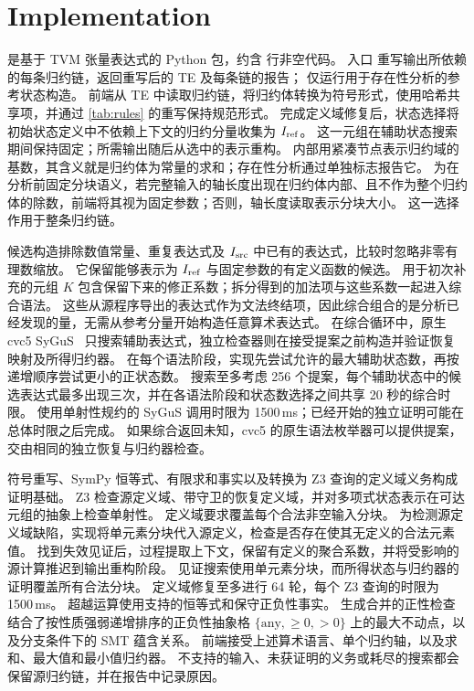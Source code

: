 \section{Implementation}
\label{sec:impl}

\sys 是基于 TVM 张量表达式的 Python 包，约含 \nLoC{} 行非空代码。
入口  重写输出所依赖的每条归约链，返回重写后的 TE 及每条链的报告； 仅运行用于存在性分析的参考状态构造。
前端从 TE 中读取归约链，将归约体转换为符号形式，使用哈希共享项，并通过 \cref{tab:rules} 的重写保持规范形式。
完成定义域修复后，状态选择将初始状态定义中不依赖上下文的归约分量收集为 $I_{\mathrm{ref}}$。
这一元组在辅助状态搜索期间保持固定；所需输出随后从选中的表示重构。
内部用紧凑节点表示归约域的基数，其含义就是归约体为常量的求和；存在性分析通过单独标志报告它。
为在分析前固定分块语义，若完整输入的轴长度出现在归约体内部、且不作为整个归约体的除数，前端将其视为固定参数；否则，轴长度读取表示分块大小。
这一选择作用于整条归约链。

候选构造排除数值常量、重复表达式及 $I_{\mathrm{src}}$ 中已有的表达式，比较时忽略非零有理数缩放。
它保留能够表示为 $I_{\mathrm{ref}}$ 与固定参数的有定义函数的候选。
用于初次补充的元组 $K$ 包含保留下来的修正系数；拆分得到的加法项与这些系数一起进入综合语法。
这些从源程序导出的表达式作为文法终结项，因此综合组合的是分析已经发现的量，无需从参考分量开始构造任意算术表达式。
在综合循环中，原生 cvc5 SyGuS~\citep{cvc5} 只搜索辅助表达式，独立检查器则在接受提案之前构造并验证恢复映射及所得归约器。
在每个语法阶段，实现先尝试允许的最大辅助状态数，再按递增顺序尝试更小的正状态数。
搜索至多考虑 256 个提案，每个辅助状态中的候选表达式最多出现三次，并在各语法阶段和状态数选择之间共享 20 秒的综合时限。
使用单射性规约的 SyGuS 调用时限为 1500\,ms；已经开始的独立证明可能在总体时限之后完成。
如果综合返回未知，cvc5 的原生语法枚举器可以提供提案，交由相同的独立恢复与归约器检查。

符号重写、SymPy 恒等式、有限求和事实以及转换为 Z3 查询的定义域义务构成证明基础。
Z3 检查源定义域、带守卫的恢复定义域，并对多项式状态表示在可达元组的抽象上检查单射性。
定义域要求覆盖每个合法非空输入分块。
为检测源定义域缺陷，实现将单元素分块代入源定义，检查是否存在使其无定义的合法元素值。
找到失效见证后，过程提取上下文，保留有定义的聚合系数，并将受影响的源计算推迟到输出重构阶段。
见证搜索使用单元素分块，而所得状态与归约器的证明覆盖所有合法分块。
定义域修复至多进行 64 轮，每个 Z3 查询的时限为 1500\,ms。
超越运算使用支持的恒等式和保守正负性事实。
生成合并的正性检查结合了按性质强弱递增排序的正负性抽象格 $\{\text{any},\geq0,>0\}$ 上的最大不动点，以及分支条件下的 SMT 蕴含关系。
前端接受上述算术语言、单个归约轴，以及求和、最大值和最小值归约器。
不支持的输入、未获证明的义务或耗尽的搜索都会保留源归约链，并在报告中记录原因。

